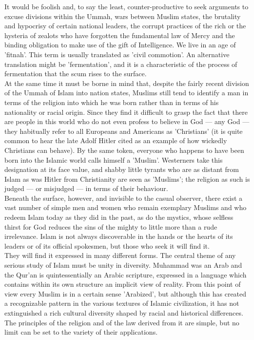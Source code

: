 \documentclass[11pt, b5paper, twoside]{book}
\begin{document}
It would be foolish and, to say the least, counter-productive to seek arguments to excuse divisions within the Ummah, wars between Muslim states, the brutality and hypocrisy of certain national leaders, the corrupt practices of the rich or the hysteria of zealots who have forgotten the fundamental law of Mercy and the binding obligation to make use of the gift of Intelligence. We live in an age of 'fitnah'. This term is usually translated as 'civil commotion'. An alternative translation might be 'fermentation', and it is a characteristic of the process of fermentation that the scum rises to the surface. \\

At the same time it must be borne in mind that, despite the fairly recent division of the Ummah of Islam into nation states, Muslims still tend to identify a man in terms of the religion into which he was born rather than in terms of his nationality or racial origin. Since they find it difficult to grasp the fact that there are people in this world who do not even profess to believe in God --- any God --- they habitually refer to all Europeans and Americans as 'Christians' (it is quite common to hear the late Adolf Hitler cited as an example of how wickedly Christians can behave). By the same token, everyone who happens to have been born into the Islamic world calls himself a 'Muslim'. Westerners take this designation at its face value, and shabby little tyrants who are as distant from Islam as was Hitler from Christianity are seen as 'Muslims'; the religion as such is judged --- or misjudged --- in terms of their behaviour. \\

Beneath the surface, however, and invisible to the casual observer, there exist a vast number of simple men and women who remain exemplary Muslims and who redeem Islam today as they did in the past, as do the mystics, whose selfless thirst for God reduces the sins of the mighty to little more than a rude irrelevance. Islam is not always discoverable in the hands or the hearts of its leaders or of its official spokesmen, but those who seek it will find it. \\

They will find it expressed in many different forms. The central theme of any serious study of Islam must be unity in diversity. Muhammad was an Arab and the Qur'an is quintessentially an Arabic scripture, expressed in a language which contains within its own structure an implicit view of reality. From this point of view every Muslim is in a certain sense 'Arabized', but although this has created a recognizable pattern in the various textures of Islamic civilization, it has not extinguished a rich cultural diversity shaped by racial and historical differences. The principles of the religion and of the law derived from it are simple, but no limit can be set to the variety of their applications. \\
\end{document}
